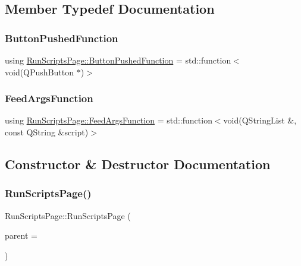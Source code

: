 \subsection{Member Typedef Documentation}
\mbox{\label{class_run_scripts_page_ab4304d9dd110792503447f673b7e6a3b}} 
\subsubsection{\texorpdfstring{ButtonPushedFunction}{ButtonPushedFunction}}
{\footnotesize\ttfamily using \mbox{\hyperlink{class_run_scripts_page_ab4304d9dd110792503447f673b7e6a3b}{Run\+Scripts\+Page\+::\+Button\+Pushed\+Function}} =  std\+::function$<$void(Q\+Push\+Button $\ast$)$>$}

\mbox{\label{class_run_scripts_page_a74087fa5854e30f514a6e807bf55ca69}} 
\subsubsection{\texorpdfstring{FeedArgsFunction}{FeedArgsFunction}}
{\footnotesize\ttfamily using \mbox{\hyperlink{class_run_scripts_page_a74087fa5854e30f514a6e807bf55ca69}{Run\+Scripts\+Page\+::\+Feed\+Args\+Function}} =  std\+::function$<$void(Q\+String\+List \&, const Q\+String \&script)$>$}



\subsection{Constructor \& Destructor Documentation}
\mbox{\label{class_run_scripts_page_ae85074da850d5f2459935b0d9b40b65b}} 
\subsubsection{\texorpdfstring{RunScriptsPage()}{RunScriptsPage()}}
{\footnotesize\ttfamily Run\+Scripts\+Page\+::\+Run\+Scripts\+Page (\begin{DoxyParamCaption}\item[{Q\+Widget $\ast$}]{parent = {} }\end{DoxyParamCaption})\hspace{0.3cm}{\ttfamily [explicit]}}

